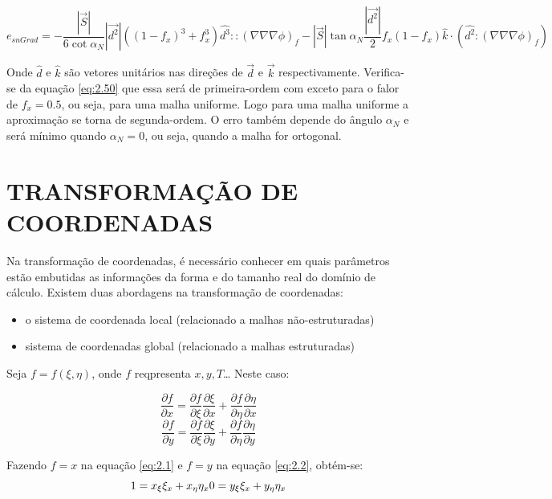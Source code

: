 \begin{equation}
    e_{snGrad} = -\frac{|\vec{S}|}{6 \cot{\alpha_N}} |\vec{d^2}| ((1-f_x)^3 + f_x^3)\hat{d^3}:: (\nabla \nabla \nabla \phi)_f - |\vec{S}| \tan{\alpha_N} \frac{|\vec{d^2}|}{2}f_x(1-f_x)\hat{k} \cdot (\hat{d^2}:(\nabla \nabla \nabla \phi)_f)
    \label{eq:2.50}
\end{equation}

Onde $\hat{d}$ e $\hat{k}$ são vetores unitários nas direções de $\vec{d}$ e $\vec{k}$ respectivamente. Verifica-se da equação \ref{eq:2.50} que essa será de primeira-ordem com exceto para o falor de $f_x=0.5$, ou seja, para uma malha uniforme. Logo para uma malha uniforme a aproximação se torna de segunda-ordem. O erro também depende do ângulo $\alpha_N$ e será mínimo quando $\alpha_N=0$, ou seja, quando a malha for ortogonal.


\chapter[TRANSFORMAÇÃO DE COORDENADAS]{TRANSFORMAÇÃO DE COORDENADAS}

Na transformação de coordenadas, é necessário conhecer em quais parâmetros estão embutidas as informações da forma e do tamanho real do domínio de cálculo. Existem duas abordagens na transformação de coordenadas:
\begin{itemize}
    \item o sistema de coordenada local (relacionado a malhas não-estruturadas)
    \item sistema de coordenadas global (relacionado a malhas estruturadas)
\end{itemize}

Seja $f=f(\xi, \eta)$, onde $f$ reqpresenta $x,y,T$\dots
Neste caso:

\begin{equation}
    \frac{\partial f}{\partial x} = \frac{\partial f}{\partial \xi}\frac{\partial \xi}{\partial x}+\frac{\partial f}{\partial \eta}\frac{\partial \eta}{\partial x}
    \label{eq:2.1}
\end{equation}
\begin{equation}
    \frac{\partial f}{\partial y} = \frac{\partial f}{\partial \xi}\frac{\partial \xi}{\partial y}+\frac{\partial f}{\partial \eta}\frac{\partial \eta}{\partial y}
    \label{eq:2.2}
\end{equation}

Fazendo $f=x$ na equação \ref{eq:2.1} e $f=y$ na equação \ref{eq:2.2}, obtém-se:
\begin{equation*}
    1 = x_\xi \xi_x + x_\eta \eta_x\\
    0 = y_\xi \xi_x + y_\eta \eta_x
\end{equation*}

